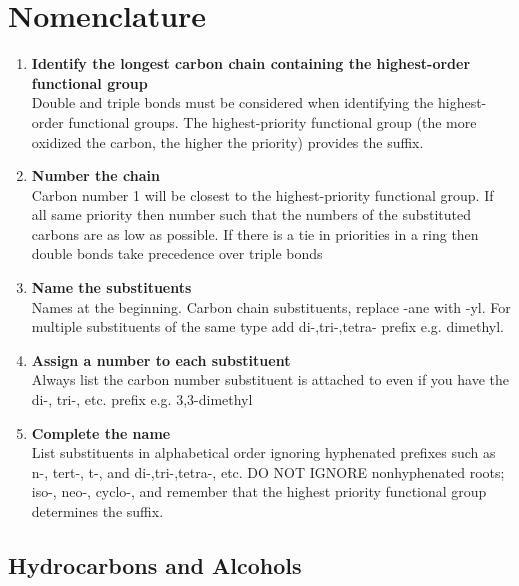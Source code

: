 \documentclass[../OChemReview.tex]{subfiles}
\begin{document}
	\chapter{Nomenclature\supdag}
	\begin{enumerate}
		\item \textbf{Identify the longest carbon chain containing the highest-order functional group}\\
		Double and triple bonds must be considered when identifying the highest-order functional groups. The highest-priority functional group (the more oxidized the carbon, the higher the priority) provides the suffix.
		\item \textbf{Number the chain}\\
		Carbon number 1 will be closest to the highest-priority functional group. If all same priority then number such that the numbers of the substituted carbons are as low as possible. If there is a tie in priorities in a ring then double bonds take precedence over triple bonds
		\item \textbf{Name the substituents}\\
		Names at the beginning. Carbon chain substituents, replace -ane with -yl. For multiple substituents of the same type add di-,tri-,tetra- prefix e.g. dimethyl.
		\item \textbf{Assign a number to each substituent}\\
		Always list the carbon number substituent is attached to even if you have the di-, tri-, etc. prefix e.g. 3,3-dimethyl
		\item \textbf{Complete the name}\\
		List substituents in alphabetical order ignoring hyphenated prefixes such as n-, tert-, t-, and di-,tri-,tetra-, etc. DO NOT IGNORE nonhyphenated roots; iso-, neo-, cyclo-, and remember that the highest priority functional group determines the suffix.
	\end{enumerate}
	
	\begin{figure}[h]
		\centering
		\setatomsep{2em}
	\end{figure}
	
	\section{Hydrocarbons and Alcohols\supdag}
	
\end{document}
